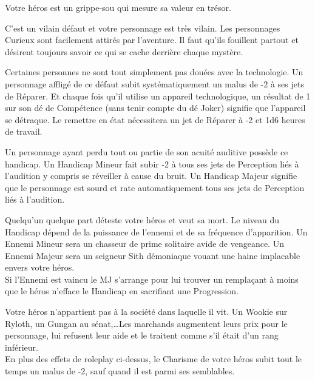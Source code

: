 \begin{description}[align=left]
    \item [Cupide (Mineur)]
        Votre héros est un grippe-sou qui mesure sa valeur en trésor.

    \item [Curieux (Majeur)]
        C’est un vilain défaut et votre personnage est très vilain. Les personnages Curieux sont facilement attirés par l’aventure. Il faut qu’ils fouillent partout et désirent toujours savoir ce qui se cache derrière chaque mystère.

    \item [Deux mains gauches (Mineur)]
        Certaines personnes ne sont tout simplement pas douées avec la technologie. Un personnage affligé de ce défaut subit systématiquement un malus de -2 à ses jets de Réparer. Et chaque fois qu’il utilise un appareil technologique, un résultat de 1 sur son dé de Compétence (sans tenir compte du dé Joker) signifie que l’appareil se détraque. Le remettre en état nécessitera un jet de Réparer à -2 et 1d6 heures de travail.

    \item [Dur d’Oreille (Mineur ou Majeur)]
        Un personnage ayant perdu tout ou partie de son acuité auditive possède ce handicap. Un Handicap Mineur fait subir -2 à tous ses jets de Perception liés à l’audition y compris se réveiller à cause du bruit. Un Handicap Majeur signifie que le personnage est sourd et rate automatiquement tous ses jets de Perception liés à l’audition.

    \item [Ennemi (Mineur ou Majeur)]
        Quelqu’un quelque part déteste votre héros et veut sa mort. Le niveau du Handicap dépend de la puissance de l’ennemi et de sa fréquence d’apparition. Un Ennemi Mineur sera un chasseur de prime solitaire avide de vengeance. Un Ennemi Majeur sera un seigneur Sith démoniaque vouant une haine implacable envers votre héros.\\
        Si l’Ennemi est vaincu le MJ s’arrange pour lui trouver un remplaçant à moins que le héros n’efface le Handicap en sacrifiant une Progression.

    \item [Étranger (Mineur)]
        Votre héros n’appartient pas à la société dans laquelle il vit. Un Wookie sur Ryloth, un Gungan au sénat,\ldots Les marchands augmentent leurs prix pour le personnage, lui refusent leur aide et le traitent comme s’il était d’un rang inférieur. \\
        En plus des effets de roleplay ci-dessus, le Charisme de votre héros subit tout le temps un malus de -2, sauf quand il est parmi ses semblables.


\end{description}
